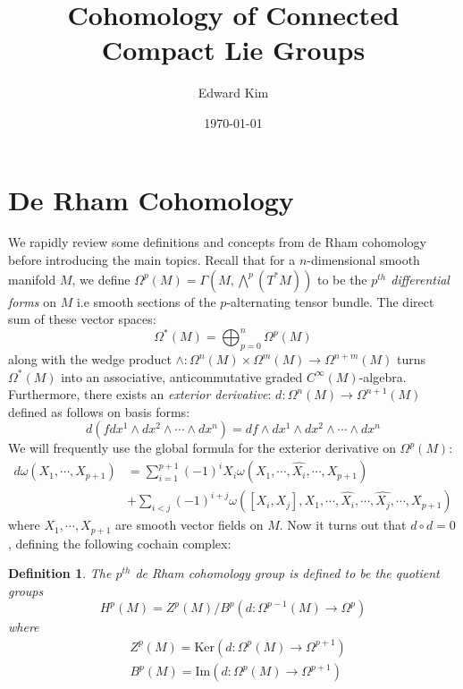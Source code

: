 \documentclass[12pt]{amsart}
\newtheorem{definition}[theorem]{Definition}
\numberwithin{equation}{section}
\begin{document}
\title{Cohomology of Connected Compact Lie Groups}
\author{Edward Kim}
\date{\today}
\maketitle
\tableofcontents

\section{De Rham Cohomology}
We rapidly review some definitions and concepts from de Rham cohomology before introducing the main topics. Recall that for a $n$-dimensional smooth manifold $M$, we define $\Omega^p(M)=\Gamma(M,\bigwedge^p(T^*M))$ to be the \emph{$p^{th}$ differential forms} on $M$ i.e smooth sections of the $p$-alternating tensor bundle. The direct sum of these vector spaces:
  $$\Omega^*(M) = \bigoplus_{p = 0}^{n} \Omega^p(M)$$
along with the wedge product $\wedge: \Omega^n(M) \times \Omega^m(M) \rightarrow \Omega^{n+m}(M)$ turns $\Omega^*(M)$ into an associative, anticommutative graded $C^{\infty}(M)$-algebra. Furthermore, there exists an \emph{exterior derivative}: $d: \Omega^{n}(M) \rightarrow \Omega^{n+1}(M)$ defined as follows on basis forms:
$$ d(fdx^1 \wedge dx^2 \wedge \cdots \wedge dx^n) = df \wedge dx^1 \wedge dx^2 \wedge \cdots \wedge dx^n$$
We will frequently use the global formula for the exterior derivative on $\Omega^p(M)$:
\begin{align} \label{globalexter}
  d\omega(X_1,\cdots, X_{p+1})
  & = \sum_{i = 1}^{p+1} (-1)^i X_i\omega(X_1,\cdots,\widehat{X_i},\cdots,X_{p+1}) \\
  & + \sum_{i < j} (-1)^{i+j} \omega([X_i,X_j],X_1,\cdots, \widehat{X_i},\cdots,\widehat{X_j},\cdots,X_{p+1})
\end{align}
where $X_1,\cdots,X_{p+1}$ are smooth vector fields on $M$.
Now it turns out that $d \circ d = 0$, defining the following cochain complex:
%
\begin{definition}
  The $p^{th}$ \emph{de Rham cohomology group} is defined to be the quotient groups
  \begin{equation}
    H^p(M) = Z^p(M) / B^p(d: \Omega^{p-1}(M) \rightarrow \Omega^{p})
  \end{equation}
  where
  \begin{align*}
    & Z^p(M) = \text{Ker}\left(d: \Omega^p(M) \rightarrow \Omega^{p+1} \right) \\
    & B^p(M) = \text{Im}\left(d: \Omega^p(M) \rightarrow \Omega^{p+1} \right)
  \end{align*}
\end{definition}
\end{document}
